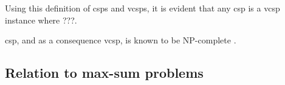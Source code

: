 Using this definition of \glspl{csp} and \glspl{vcsp}, it is evident that any \gls{csp} is a \gls{vcsp} instance where ???.

\gls{csp}, and as a consequence \gls{vcsp}, is known to be NP-complete \parencite{Mackworth93}.

\subsection{Relation to max-sum problems}
\textcite{Werner07}

